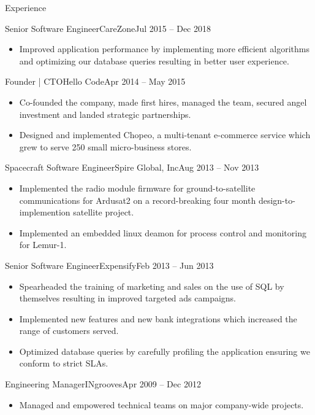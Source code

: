 \documentclass[calibri]{mcdowellcv}
\begin{document}
\begin{cvsection}{Experience}
\begin{cvsubsection}{Senior Software Engineer}{CareZone}{Jul 2015 -- Dec 2018}
\begin{itemize}
    \item Improved application performance by implementing more efficient algorithms and optimizing our database queries resulting in better user experience.
		\end{itemize}
	\end{cvsubsection}
	\begin{cvsubsection}{Founder | CTO}{Hello Code}{Apr 2014 -- May 2015}
		\begin{itemize}
    \item Co-founded the company, made first hires, managed the team, secured angel investment and landed strategic partnerships.
    \item Designed and implemented Chopeo, a multi-tenant e-commerce service which grew to serve 250 small micro-business stores.
		\end{itemize}
	\end{cvsubsection}
	\begin{cvsubsection}{Spacecraft Software Engineer}{Spire Global, Inc}{Aug 2013 -- Nov 2013}
		\begin{itemize}%
    \item Implemented the radio module firmware for ground-to-satellite communications for Ardusat2 on a record-breaking four month design-to-implemention satellite project.
    \item Implemented an embedded linux deamon for process control and monitoring for Lemur-1.
		\end{itemize}
	\end{cvsubsection}
	\begin{cvsubsection}{Senior Software Engineer}{Expensify}{Feb 2013 -- Jun 2013}
		\begin{itemize}%
    \item Spearheaded the training of marketing and sales on the use of SQL by themselves resulting in improved targeted ads campaigns.
    \item Implemented new features and new bank integrations which increased the range of customers served.
    \item Optimized database queries by carefully profiling the application ensuring we conform to strict SLAs.
		\end{itemize}
	\end{cvsubsection}
	\begin{cvsubsection}{Engineering Manager}{INgrooves}{Apr 2009 -- Dec 2012}
		\begin{itemize}%
    \item Managed and empowered technical teams on major company-wide projects.

\end{itemize}
\end{cvsubsection}
\end{cvsection}
\end{document}
